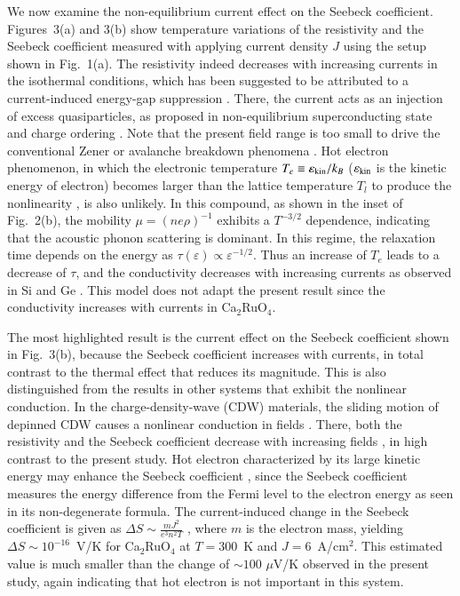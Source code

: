 \documentclass[aps,twocolumn,showpacs,preprintnumbers,amsmath,amssymb,floats,citeautoscript,nobalancelastpage]{revtex4-1}
\begin{document}
We now examine the non-equilibrium current effect on the Seebeck coefficient.
Figures~3(a) and 3(b) show temperature variations of the resistivity
and the Seebeck coefficient measured with applying current density $J$ using the setup shown in Fig.~1(a). 
The resistivity indeed decreases with increasing currents in the isothermal conditions, 
which has been suggested to be attributed to a current-induced energy-gap suppression \cite{Okazaki2013}.
There, the current acts as an injection of excess quasiparticles,
as proposed in non-equilibrium superconducting state \cite{Owen1972} and charge ordering \cite{Ajisaka2009}.
Note that the present field range is too small to drive the conventional Zener or avalanche breakdown phenomena \cite{Nakamura2013,Okazaki2013}.
Hot electron phenomenon, in which 
the electronic temperature $T_e\equiv\varepsilon_{\rm kin}/k_B$ ($\varepsilon_{\rm kin}$ is the kinetic energy of electron)
becomes larger than the lattice temperature $T_l$ to produce the nonlinearity \cite{Conwellreview},
is also unlikely.
In this compound, as shown in the inset of Fig.~2(b), the mobility $\mu=(ne\rho)^{-1}$ exhibits a $T^{-3/2}$ dependence,
indicating that the acoustic phonon scattering is dominant.
In this regime, the relaxation time depends on the energy as $\tau(\varepsilon)\propto \varepsilon^{-1/2}$.
Thus an increase of $T_e$ leads to a decrease of $\tau$, and
the conductivity decreases with increasing currents as observed in Si and Ge \cite{Ryder1953}.
This model does not adapt the present result since the conductivity increases with currents in Ca$_2$RuO$_4$.

The most highlighted result is the current effect on the Seebeck coefficient shown in Fig.~3(b), because 
the Seebeck coefficient increases with currents, in total contrast to the thermal effect that reduces its magnitude.
This is also distinguished from the results in other systems that exhibit the nonlinear conduction.
In the charge-density-wave (CDW) materials, the sliding motion of depinned CDW causes a nonlinear conduction in fields \cite{Gruner1988}.
There, both the resistivity and the Seebeck coefficient decrease with increasing fields \cite{Stokes1984}, 
in high contrast to the present study.
Hot electron characterized by its large kinetic energy may enhance the Seebeck coefficient \cite{Zebarjadi2007},
since the Seebeck coefficient measures the energy difference 
from the Fermi level to the electron energy as seen in its non-degenerate formula.
The current-induced change in the Seebeck coefficient is given as
$\Delta S \sim \frac{mJ^2}{e^3n^2T}$ \cite{Zebarjadi2007},
where $m$ is the electron mass, yielding 
$\Delta S \sim 10^{-16}$~V/K for Ca$_2$RuO$_4$ at $T=300$~K and $J = 6$~A/cm$^2$.
This estimated value is much smaller than the change of $\sim 100$ $\mu$V/K observed in the present study,
again indicating that hot electron is not important in this system.
\end{document}
